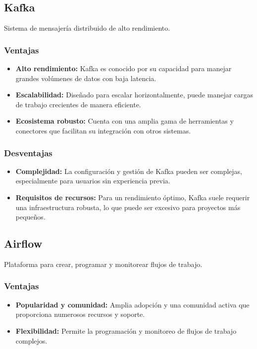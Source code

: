 \subsection{Kafka}
Sistema de mensajería distribuido de alto rendimiento.

\subsubsection{Ventajas}
\begin{itemize}
    \item \textbf{Alto rendimiento:} Kafka es conocido por su capacidad para manejar grandes volúmenes de datos con baja latencia.
    
    \item \textbf{Escalabilidad:} Diseñado para escalar horizontalmente, puede manejar cargas de trabajo crecientes de manera eficiente.
    
    \item \textbf{Ecosistema robusto:} Cuenta con una amplia gama de herramientas y conectores que facilitan su integración con otros sistemas.
\end{itemize}

\subsubsection{Desventajas}
\begin{itemize}
    \item \textbf{Complejidad:} La configuración y gestión de Kafka pueden ser complejas, especialmente para usuarios sin experiencia previa.
    
    \item \textbf{Requisitos de recursos:} Para un rendimiento óptimo, Kafka suele requerir una infraestructura robusta, lo que puede ser excesivo para proyectos más pequeños.
\end{itemize}

\subsection{Airflow}
Plataforma para crear, programar y monitorear flujos de trabajo.

\subsubsection{Ventajas}
\begin{itemize}
    \item \textbf{Popularidad y comunidad:} Amplia adopción y una comunidad activa que proporciona numerosos recursos y soporte.
    
    \item \textbf{Flexibilidad:} Permite la programación y monitoreo de flujos de trabajo complejos.
\end{itemize}

